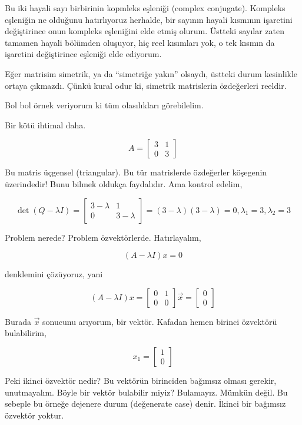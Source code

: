 \documentclass[12pt,fleqn]{article}\usepackage{../../common}
\begin{document}
Bu iki hayali sayı birbirinin kopmleks eşleniği (complex
conjugate). Kompleks eşleniğin ne olduğunu hatırlıyoruz herhalde, bir
sayının hayali kısmının işaretini değiştirince onun kompleks eşleniğini
elde etmiş olurum. Üstteki sayılar zaten tamamen hayali bölümden oluşuyor,
hiç reel kısımları yok, o tek kısmın da işaretini değiştirince eşleniği
elde ediyorum. 

Eğer matrisim simetrik, ya da ``simetriğe yakın'' olsaydı, üstteki durum
kesinlikle ortaya çıkmazdı. Çünkü kural odur ki, simetrik matrislerin
özdeğerleri reeldir. 

Bol bol örnek veriyorum ki tüm olasılıkları görebilelim. 

Bir kötü ihtimal daha.

$$ A = 
\left[\begin{array}{ccc}
3 & 1 \\ 0 & 3
\end{array}\right]
 $$

Bu matris üçgensel (triangular). Bu tür matrislerde özdeğerler köşegenin
üzerindedir! Bunu bilmek oldukça faydalıdır. Ama kontrol edelim,

$$ \det(Q - \lambda I) = 
\left[\begin{array}{ccc}
3-\lambda & 1 \\
0 & 3-\lambda
\end{array}\right] = (3-\lambda)(3-\lambda) = 0, 
\lambda_1 = 3, \lambda_2 = 3
 $$

Problem nerede? Problem özvektörlerde. Hatırlayalım, 

$$ (A-\lambda I)x = 0$$

denklemini çözüyoruz, yani

$$ (A-\lambda I)x = 
\left[\begin{array}{cc}
0 & 1 \\ 
0 & 0
\end{array}\right]
\vec{x}
=
\left[\begin{array}{c}
0 \\ 0
\end{array}\right]
$$

Burada $\vec{x}$ sonucunu arıyorum, bir vektör. Kafadan hemen birinci
özvektörü bulabilirim, 

$$ x_1 = \left[\begin{array}{c}
1 \\ 0
\end{array}\right] $$

Peki ikinci özvektör nedir? Bu vektörün birinciden bağımsız olması gerekir,
unutmayalım. Böyle bir vektör bulabilir miyiz? Bulamayız. Mümkün değil. Bu
sebeple bu örneğe dejenere durum (değenerate case) denir. İkinci bir
bağımsız özvektör yoktur. 
\end{document}
